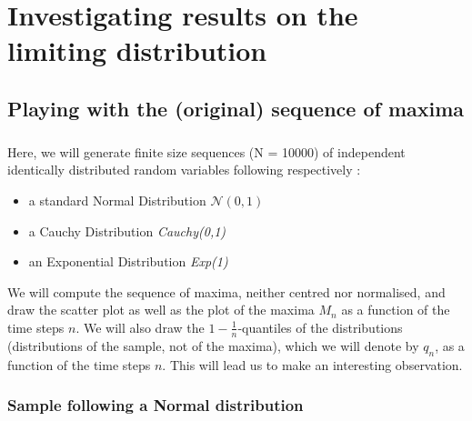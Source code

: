 \chapter{Investigating results on the limiting distribution}
\section{Playing with the (original) sequence of maxima}
\paragraph{}
Here, we will generate finite size sequences (N = 10000) of independent identically distributed random variables following respectively :
\begin{itemize}
	\item a standard Normal Distribution $\mathcal{N}(0,1)$
	\item a Cauchy Distribution \textit{Cauchy(0,1)}
	\item an Exponential Distribution \textit{Exp(1)}
\end{itemize}
We will compute the sequence of maxima, neither centred nor normalised, and draw the scatter plot as well as the plot of the maxima  $M_n$ as a function of the time steps $n$.
We will also draw the $1 - \frac{1}{n}$-quantiles of the distributions (distributions of the sample, not of the maxima), which we will denote by $q_n$, as a function of the time steps $n$. This will lead us to make an interesting observation.
\subsection{Sample following a Normal distribution}
